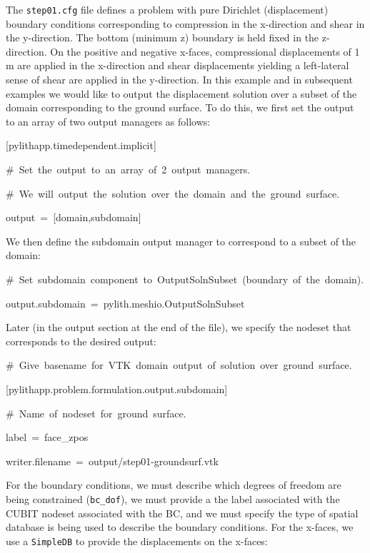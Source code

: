 The \texttt{step01.cfg} file defines a problem with pure Dirichlet
(displacement) boundary conditions corresponding to compression in
the x-direction and shear in the y-direction. The bottom (minimum
z) boundary is held fixed in the z-direction. On the positive and
negative x-faces, compressional displacements of 1 m are applied in
the x-direction and shear displacements yielding a left-lateral sense
of shear are applied in the y-direction. In this example and in subsequent
examples we would like to output the displacement solution over a
subset of the domain corresponding to the ground surface. To do this,
we first set the output to an array of two output managers as follows:
\begin{lyxcode}
{[}pylithapp.timedependent.implicit{]}

\#~Set~the~output~to~an~array~of~2~output~managers.

\#~We~will~output~the~solution~over~the~domain~and~the~ground~surface.

output~=~{[}domain,subdomain{]}
\end{lyxcode}
We then define the subdomain output manager to correspond to a subset
of the domain:
\begin{lyxcode}
\#~Set~subdomain~component~to~OutputSolnSubset~(boundary~of~the~domain).

output.subdomain~=~pylith.meshio.OutputSolnSubset
\end{lyxcode}
Later (in the output section at the end of the file), we specify the
nodeset that corresponds to the desired output:
\begin{lyxcode}
\#~Give~basename~for~VTK~domain~output~of~solution~over~ground~surface.

{[}pylithapp.problem.formulation.output.subdomain{]}

\#~Name~of~nodeset~for~ground~surface.

label~=~face\_zpos

writer.filename~=~output/step01-groundsurf.vtk
\end{lyxcode}
For the boundary conditions, we must describe which degrees of freedom
are being constrained (\texttt{bc\_dof}), we must provide a the label
associated with the CUBIT nodeset associated with the BC, and we must
specify the type of spatial database is being used to describe the
boundary conditions. For the x-faces, we use a \texttt{SimpleDB} to
provide the displacements on the x-faces:
